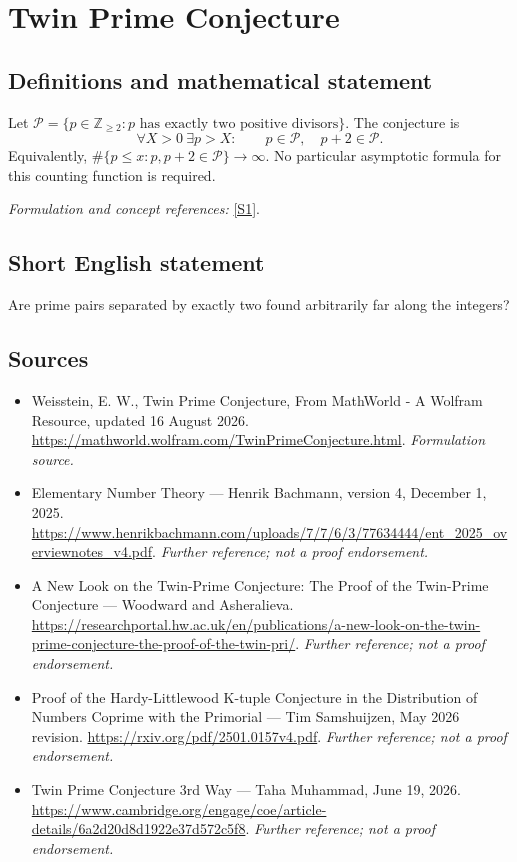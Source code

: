 \documentclass[11pt]{article}
\begin{document}
\section*{\texorpdfstring{Twin Prime Conjecture}{Twin Prime Conjecture}}\label{11}
\subsection{Definitions and mathematical statement}
Let $\mathcal P=\{p\in{\mathbb{Z}}_{\ge2}:p\text{ has exactly two positive divisors}\}$. The conjecture is
\[
 \forall X>0\ \exists p>X:\qquad p\in\mathcal P,\quad p+2\in\mathcal P.
\]
Equivalently, $\#\{p\le x:p,p+2\in\mathcal P\}\to\infty$. No particular asymptotic formula for this counting function is required.
\par\smallskip\textit{Formulation and concept references:} \href{https://mathworld.wolfram.com/TwinPrimeConjecture.html}{[S1]}.

\subsection{Short English statement}
Are prime pairs separated by exactly two found arbitrarily far along the integers?
\subsection{Sources}
\begin{itemize}
\item[S1]Weisstein, E. W., Twin Prime Conjecture, From MathWorld - A Wolfram Resource, updated 16 August 2026.
\url{https://mathworld.wolfram.com/TwinPrimeConjecture.html}.
\textit{Formulation source.}
\item[S2]Elementary Number Theory — Henrik Bachmann, version 4, December 1, 2025.
\url{https://www.henrikbachmann.com/uploads/7/7/6/3/77634444/ent_2025_overviewnotes_v4.pdf}.
\textit{Further reference; not a proof endorsement.}
\item[S3]A New Look on the Twin-Prime Conjecture: The Proof of the Twin-Prime Conjecture — Woodward and Asheralieva.
\url{https://researchportal.hw.ac.uk/en/publications/a-new-look-on-the-twin-prime-conjecture-the-proof-of-the-twin-pri/}.
\textit{Further reference; not a proof endorsement.}
\item[S4]Proof of the Hardy-Littlewood K-tuple Conjecture in the Distribution of Numbers Coprime with the Primorial — Tim Samshuijzen, May 2026 revision.
\url{https://rxiv.org/pdf/2501.0157v4.pdf}.
\textit{Further reference; not a proof endorsement.}
\item[S5]Twin Prime Conjecture 3rd Way — Taha Muhammad, June 19, 2026.
\url{https://www.cambridge.org/engage/coe/article-details/6a2d20d8d1922e37d572c5f8}.
\textit{Further reference; not a proof endorsement.}
\end{itemize}
\end{document}
